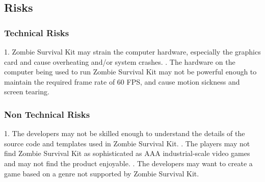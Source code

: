 \documentclass[12pt, titlepage]{article}
\begin{document}


\subsection{Risks}

\subsubsection{Technical Risks}
1. Zombie Survival Kit may strain the computer hardware, especially the graphics card and cause overheating and/or system crashes.
. The hardware on the computer being used to run Zombie Survival Kit may not be powerful enough to maintain the required frame rate of 60 FPS, and cause motion sickness and screen tearing.

\subsubsection{Non Technical Risks}
1. The developers may not be skilled enough to understand the details of the source code and templates used in Zombie Survival Kit.
. The players may not find Zombie Survival Kit as sophisticated as AAA industrial-scale video games and may not find the product enjoyable.
. The developers may want to create a game based on a genre not supported by Zombie Survival Kit.



\end{document}
